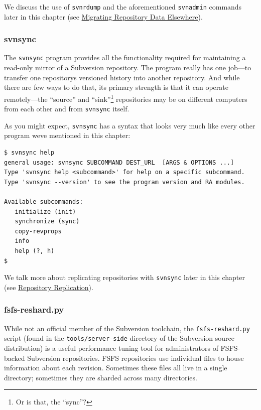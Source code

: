 We discuss the use of \texttt{svnrdump} and the aforementioned
\texttt{svnadmin} commands later in this chapter (see
\hyperref[svn.reposadmin.maint.migrate]{Migrating Repository Data
Elsewhere}).

\subsubsection{svnsync}\label{svn.reposadmin.maint.tk.svnsync}

The \texttt{svnsync} program provides all the functionality required for
maintaining a read-only mirror of a Subversion repository. The program
really has one job---to transfer one repository\textquotesingle s
versioned history into another repository. And while there are few ways
to do that, its primary strength is that it can operate remotely---the
``source'' and ``sink''\footnote{Or is that, the ``sync''?} repositories
may be on different computers from each other and from \texttt{svnsync}
itself.

As you might expect, \texttt{svnsync} has a syntax that looks very much
like every other program we\textquotesingle ve mentioned in this
chapter:

\begin{verbatim}
$ svnsync help
general usage: svnsync SUBCOMMAND DEST_URL  [ARGS & OPTIONS ...]
Type 'svnsync help <subcommand>' for help on a specific subcommand.
Type 'svnsync --version' to see the program version and RA modules.

Available subcommands:
   initialize (init)
   synchronize (sync)
   copy-revprops
   info
   help (?, h)
$
\end{verbatim}

We talk more about replicating repositories with \texttt{svnsync} later
in this chapter (see
\hyperref[svn.reposadmin.maint.replication]{Repository Replication}).

\subsubsection{fsfs-reshard.py}\label{svn.reposadmin.maint.tk.fsfsreshard}

While not an official member of the Subversion toolchain, the
\texttt{fsfs-reshard.py} script (found in the \texttt{tools/server-side}
directory of the Subversion source distribution) is a useful performance
tuning tool for administrators of FSFS-backed Subversion repositories.
FSFS repositories use individual files to house information about each
revision. Sometimes these files all live in a single directory;
sometimes they are sharded across many directories.

